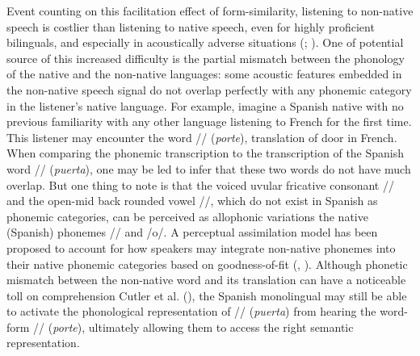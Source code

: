 \documentclass[
]{article}
\begin{document}
Event counting on this facilitation effect of form-similarity, listening
to non-native speech is costlier than listening to native speech, even
for highly proficient bilinguals, and especially in acoustically adverse
situations (;
). One of
potential source of this increased difficulty is the partial mismatch
between the phonology of the native and the non-native languages: some
acoustic features embedded in the non-native speech signal do not
overlap perfectly with any phonemic category in the listener's native
language. For example, imagine a Spanish native with no previous
familiarity with any other language listening to French for the first
time. This listener may encounter the word //
(\emph{porte}), translation of door in French. When comparing the
phonemic transcription to the transcription of the Spanish word
// (\emph{puerta}), one may be led to infer that these
two words do not have much overlap. But one thing to note is that the
voiced uvular fricative consonant // and the open-mid back
rounded vowel //, which do not exist in Spanish as phonemic
categories, can be perceived as allophonic variations the native
(Spanish) phonemes // and /o/. A perceptual assimilation
model has been proposed to account for how speakers may integrate
non-native phonemes into their native phonemic categories based on
goodness-of-fit (,
). Although phonetic mismatch
between the non-native word and its translation can have a noticeable
toll on comprehension Cutler et al.
(), the Spanish monolingual may
still be able to activate the phonological representation of
// (\emph{puerta}) from hearing the word-form
// (\emph{porte}), ultimately allowing them to access the
right semantic representation.
\end{document}
